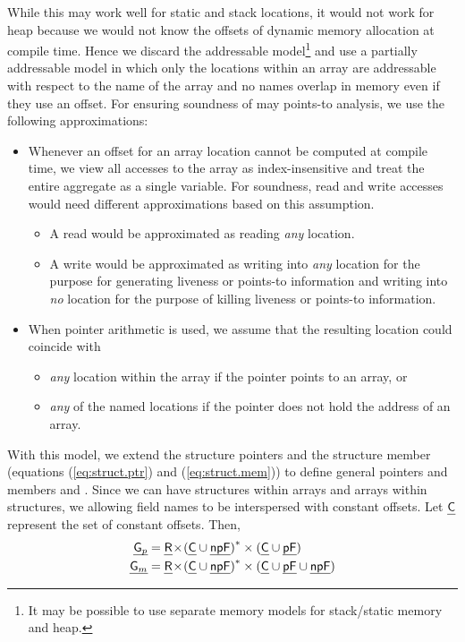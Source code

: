 \documentclass[a4paper,11pt,fleqn]{article}
\newcommand{\const}{\text{\sf\em C\/}\xspace}
\begin{document}
While this may work well for static and stack locations, it would
not work for heap because we would not know the offsets of dynamic
memory allocation at compile time. Hence we discard the addressable
model\footnote{It may be possible to use separate memory models for
stack/static memory and heap.} and use a partially addressable model in
which only the locations within an array are addressable with respect to
the name of the array and no names overlap in memory even if they use
an offset. For ensuring soundness of may points-to analysis, we use the
following approximations:
\begin{itemize}
\item Whenever an offset for an array location cannot be computed at
      compile time, we view all accesses to the array as index-insensitive and treat the
      entire aggregate as a single variable. For soundness, read and
      write accesses would need different approximations based on this
      assumption.
	\begin{itemize}
	\item A read would be approximated as reading {\em any\/} location. 
	\item A write would be approximated as writing into {\em any\/}
      location for the purpose for generating liveness or points-to information and
      writing into {\em no\/} location for the purpose of 
      killing liveness or points-to information.
	\end{itemize}
\item When pointer arithmetic is used, we assume that the resulting location could coincide
      with 
	\begin{itemize}
	\item {\em any\/} location within the array if the pointer points to an array, or
	\item {\em any\/} of the named locations if the pointer does not hold the address of an array.
	\end{itemize}
\end{itemize}

With this model, we extend the structure pointers \structp and the structure member \structm
(equations (\ref{eq:struct.ptr}) and (\ref{eq:struct.mem})) to define
general pointers and members \genp and \genm. Since we can have
structures within arrays and arrays within structures, we allowing
field names to be interspersed with constant offsets.
Let $\const$ represent the set of constant offsets. Then,
\begin{align}
\genp & = \rootp \! \times\! 
	 \left(\const \cup \npfield\right)^{*}
	\times \left(\const \cup \pfield \right)
			\\
\genm & = \rootp \! \times\! 
	 \left(\const \cup \npfield\right)^{*}
	\times \left(\const \cup \pfield\cup\npfield\right)
\end{align}
\end{document}
